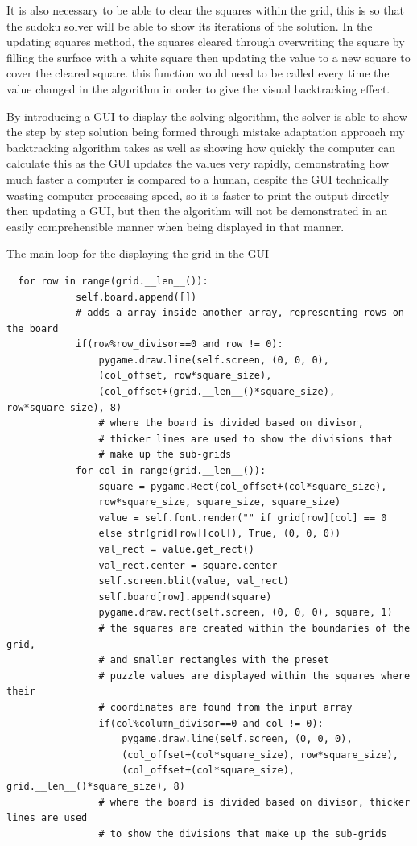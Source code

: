 \documentclass[]{final_report}
\begin{document}
It is also necessary to be able to clear the squares within the grid, this is so that the sudoku solver will be able to show its iterations of the solution. In the updating squares method, the squares cleared through overwriting the square by filling the surface with a white square then updating the value to a new square to cover the cleared square. this function would need to be called every time the value changed in the algorithm in order to give the visual backtracking effect. 

By introducing a GUI to display the solving algorithm, the solver is able to show the step by step solution being formed through mistake adaptation approach my backtracking algorithm takes as well as showing how quickly the computer can calculate this as the GUI updates the values very rapidly, demonstrating how much faster a computer is compared to a human, despite the GUI technically wasting computer processing speed, so it is faster to print the output directly then updating a GUI, but then the algorithm will not be demonstrated in an easily comprehensible manner when being displayed in that manner. 

The main loop for the displaying the grid in the GUI
\begin{verbatim}
  for row in range(grid.__len__()):
            self.board.append([])
            # adds a array inside another array, representing rows on the board
            if(row%row_divisor==0 and row != 0):
                pygame.draw.line(self.screen, (0, 0, 0), 
                (col_offset, row*square_size), 
                (col_offset+(grid.__len__()*square_size), row*square_size), 8)
                # where the board is divided based on divisor, 
                # thicker lines are used to show the divisions that 
                # make up the sub-grids
            for col in range(grid.__len__()):
                square = pygame.Rect(col_offset+(col*square_size), 
                row*square_size, square_size, square_size)
                value = self.font.render("" if grid[row][col] == 0 
                else str(grid[row][col]), True, (0, 0, 0))
                val_rect = value.get_rect()
                val_rect.center = square.center
                self.screen.blit(value, val_rect)
                self.board[row].append(square)
                pygame.draw.rect(self.screen, (0, 0, 0), square, 1)
                # the squares are created within the boundaries of the grid,
                # and smaller rectangles with the preset
                # puzzle values are displayed within the squares where their 
                # coordinates are found from the input array
                if(col%column_divisor==0 and col != 0):
                    pygame.draw.line(self.screen, (0, 0, 0), 
                    (col_offset+(col*square_size), row*square_size), 
                    (col_offset+(col*square_size), grid.__len__()*square_size), 8)
                # where the board is divided based on divisor, thicker lines are used 
                # to show the divisions that make up the sub-grids
\end{verbatim}
\end{document}
